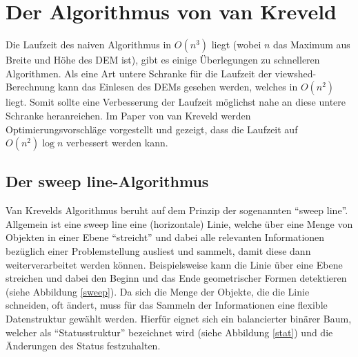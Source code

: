 \section{Der Algorithmus von van Kreveld}

Die Laufzeit des naiven Algorithmus in $O(n^3)$ liegt (wobei $n$ das Maximum aus Breite und Höhe des DEM ist), gibt es einige Überlegungen zu 
schnelleren Algorithmen. Als eine Art untere Schranke für die Laufzeit der viewshed-Berechnung kann das Einlesen des DEMs gesehen werden, welches 
in $O(n^2)$ liegt. Somit sollte eine Verbesserung der Laufzeit möglichst nahe an diese untere Schranke heranreichen. Im Paper von van Kreveld 
\cite{vanKrev} werden Optimierungsvorschläge vorgestellt und gezeigt, dass die Laufzeit auf $O(n^2)\log n$ verbessert werden kann. 

\subsection{Der sweep line-Algorithmus}
Van Krevelds Algorithmus beruht auf dem Prinzip der sogenannten ``sweep line''. Allgemein ist eine sweep line eine (horizontale) Linie, 
welche über eine Menge von Objekten in einer Ebene ``streicht'' und dabei alle relevanten Informationen bezüglich einer Problemstellung ausliest und 
sammelt, damit diese dann weiterverarbeitet werden können. Beispielsweise kann die Linie über eine Ebene streichen und dabei den Beginn und das Ende 
geometrischer Formen detektieren (siehe Abbildung \ref{sweep}). Da sich die Menge der Objekte, die die Linie schneiden, oft ändert, muss für das 
Sammeln der Informationen eine flexible Datenstruktur gewählt werden. Hierfür eignet sich ein balancierter binärer Baum, welcher als 
``Statusstruktur'' bezeichnet wird (siehe Abbildung \ref{stat}) und die Änderungen des Status festzuhalten. 

